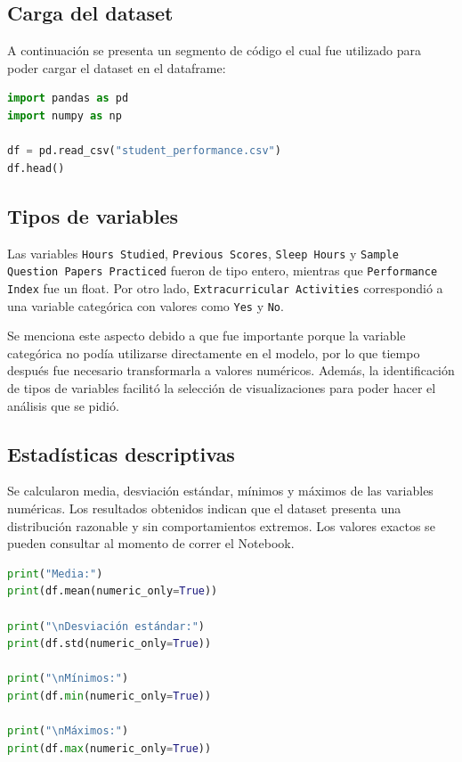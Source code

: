 \documentclass[conference]{IEEEtran}
\newcommand{\CodeBlockSpaceBefore}{\vspace{8pt}}
\newcommand{\CodeBlockSpaceAfter}{\vspace{10pt}}
\begin{document}
\subsection{Carga del dataset}

A continuación se presenta un segmento de código el cual fue utilizado para poder cargar el dataset en el dataframe:

\CodeBlockSpaceBefore
\begin{lstlisting}[language=Python, caption={Carga inicial del dataset}]
import pandas as pd
import numpy as np

df = pd.read_csv("student_performance.csv")
df.head()
\end{lstlisting}
\CodeBlockSpaceAfter

\subsection{Tipos de variables}

Las variables \texttt{Hours Studied}, \texttt{Previous Scores}, \texttt{Sleep Hours} y \texttt{Sample Question Papers Practiced} fueron de tipo entero, mientras que \texttt{Performance Index} fue un float. Por otro lado, \texttt{Extracurricular Activities} correspondió a una variable categórica con valores como \texttt{Yes} y \texttt{No}.

Se menciona este aspecto debido a que fue importante porque la variable categórica no podía utilizarse directamente en el modelo, por lo que tiempo después fue necesario transformarla a valores numéricos. Además, la identificación de tipos de variables facilitó la selección de visualizaciones para poder hacer el análisis que se pidió.

\subsection{Estadísticas descriptivas}

Se calcularon media, desviación estándar, mínimos y máximos de las variables numéricas. Los resultados obtenidos indican que el dataset presenta una distribución razonable y sin comportamientos extremos. Los valores exactos se pueden consultar al momento de correr el Notebook.

\CodeBlockSpaceBefore
\begin{lstlisting}[language=Python, caption={Cálculo de estadísticas descriptivas}]
print("Media:")
print(df.mean(numeric_only=True))

print("\nDesviación estándar:")
print(df.std(numeric_only=True))

print("\nMínimos:")
print(df.min(numeric_only=True))

print("\nMáximos:")
print(df.max(numeric_only=True))
\end{lstlisting}
\CodeBlockSpaceAfter
\end{document}
